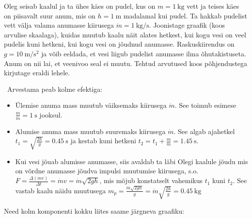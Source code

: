 
Oleg seisab kaalul ja ta ühes käes on pudel, kus on $m=\SI{1}{\kilogram}$ vett ja teises käes on piisavalt suur anum, mis on $h=\SI{1}{\meter}$ madalamal kui pudel. Ta hakkab pudelist vett välja valama anumasse kiirusega $\dot{m}=\SI{1}{\kilo\gram / \second}$.
Joonistage graafik (koos arvulise skaalaga), kuidas muutub kaalu näit alates hetkest, kui kogu vesi on veel pudelis kuni hetkeni, kui kogu vesi on jõudnud anumasse. Raskuskiirendus on $g=\SI{10}{\meter / \second\squared}$ ja võib eeldada, et vesi liigub pudelist anumasse ilma õhutakistuseta. Anum on nii lai, et veenivoo seal ei muutu. Tehtud arvutused koos põhjendustega kirjutage eraldi lehele.




\hint

\solu
\
Arvestama peab kolme efektiga:
\begin{itemize}
\item Ülemise anuma mass muutub väiksemaks kiirusega $\dot{m}$. See toimub esimese $\frac{m}{\dot{m}}=\SI{1}{\second}$ jooksul.
\item Alumise anuma mass muutub suuremaks kiirusega $\dot{m}$. See algab ajahetkel $t_1=\sqrt{\frac{2h}{g}}= \SI{0.45}{\second}$ ja kestab kuni hetkeni $t_2 = t_1 + \frac{m}{\dot{m}} = \SI{1.45}{\second}$.
\item Kui vesi jõuab alumisse anumasse, siis avaldab ta läbi Olegi kaalule jõudu mis on võrdne anumasse jõudva impulsi muutumise kiirusega, s.o. $F = \frac{\Delta (mv)}{\Delta{t}} = \dot{m}v = \dot{m} \sqrt{2gh}$, mis mõjub konstatselt vahemikus $t_1$ kuni $t_2$. See vastab kaalu näidu muutusega $m_p = \frac{\dot{m} \sqrt{2gh}}{g} = \dot{m}\sqrt{\frac{2h}{g}}= \SI{0.45}{\kilo\gram}$
\end{itemize}
Need kolm komponenti kokku liites saame järgneva graafiku:

\begin{figure}[h]
\centering
\end{figure}
\probend